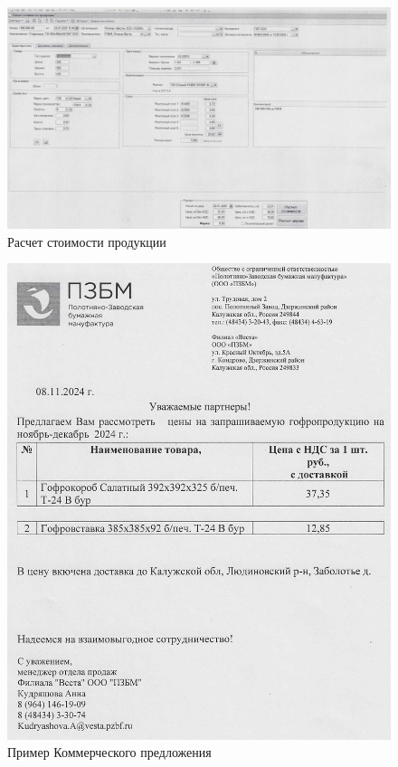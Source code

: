 \begin{figure}
\begin{center}
\includegraphics[height=0.38\textheight, width=1.3\textwidth, keepaspectratio]{Pics/I.2.4..jpg}
\end{center}
\caption{Расчет стоимости продукции}
\label{pic:I.2.4..jpg}
\end{figure}
\clearpage

\begin{figure}
\begin{center}
\includegraphics[height=0.8\textheight, width=1.5\textwidth, keepaspectratio]{Pics/I.4.jpg}
\end{center}
\caption{Пример Коммерческого предложения}
\label{pic:I.4.jpg}
\end{figure}
\clearpage

